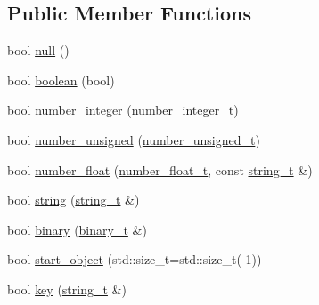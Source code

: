 \subsection*{Public Member Functions}
\begin{DoxyCompactItemize}
\item 
bool \hyperlink{classnlohmann_1_1detail_1_1json__sax__acceptor_ad7ad55168af6e03ed8b844c94a17b9ce}{null} ()
\item 
bool \hyperlink{classnlohmann_1_1detail_1_1json__sax__acceptor_a3f5fe42a9b195de8d251d6d98d5ee92c}{boolean} (bool)
\item 
bool \hyperlink{classnlohmann_1_1detail_1_1json__sax__acceptor_a976bf4ce6e9a2ffe48f683ddff80af00}{number\+\_\+integer} (\hyperlink{classnlohmann_1_1detail_1_1json__sax__acceptor_a41876b17c0e8bdb55580eaf5e4e2ded8}{number\+\_\+integer\+\_\+t})
\item 
bool \hyperlink{classnlohmann_1_1detail_1_1json__sax__acceptor_ad15b288f3351287edbe289502f595491}{number\+\_\+unsigned} (\hyperlink{classnlohmann_1_1detail_1_1json__sax__acceptor_ae07454608ea6f3cfb765f95e3c850043}{number\+\_\+unsigned\+\_\+t})
\item 
bool \hyperlink{classnlohmann_1_1detail_1_1json__sax__acceptor_aebf8800023eb20d472f111f86b189e60}{number\+\_\+float} (\hyperlink{classnlohmann_1_1detail_1_1json__sax__acceptor_a5502f483fc60a1bcd73e0e46b6ab36e4}{number\+\_\+float\+\_\+t}, const \hyperlink{classnlohmann_1_1detail_1_1json__sax__acceptor_a3a8078bbf865ec355106f6048241609a}{string\+\_\+t} \&)
\item 
bool \hyperlink{classnlohmann_1_1detail_1_1json__sax__acceptor_aaa69255e757a6ecc4403a2aa4931fc60}{string} (\hyperlink{classnlohmann_1_1detail_1_1json__sax__acceptor_a3a8078bbf865ec355106f6048241609a}{string\+\_\+t} \&)
\item 
bool \hyperlink{classnlohmann_1_1detail_1_1json__sax__acceptor_a3d193985aac764f99398e3ae8ba0c5db}{binary} (\hyperlink{classnlohmann_1_1detail_1_1json__sax__acceptor_a56346d95ee4e539eaded2e6826fecf66}{binary\+\_\+t} \&)
\item 
bool \hyperlink{classnlohmann_1_1detail_1_1json__sax__acceptor_a822bbca11a9fea0aa337018e351755f5}{start\+\_\+object} (std\+::size\+\_\+t=std\+::size\+\_\+t(-\/1))
\item 
bool \hyperlink{classnlohmann_1_1detail_1_1json__sax__acceptor_a59e1ea5e9c8d25346a564bf9287a5c2a}{key} (\hyperlink{classnlohmann_1_1detail_1_1json__sax__acceptor_a3a8078bbf865ec355106f6048241609a}{string\+\_\+t} \&)
\item 

\end{DoxyCompactItemize}
